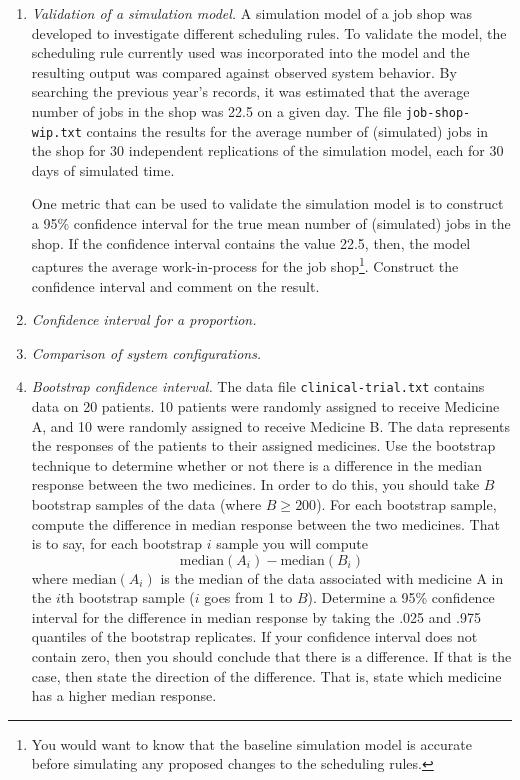 \begin{enumerate}
\item \emph{Validation of a simulation model.} A simulation model of a
  job shop was developed to investigate different scheduling rules. To
  validate the model, the scheduling rule currently used was
  incorporated into the model and the resulting output was compared
  against observed system behavior. By searching the previous year’s
  records, it was estimated that the average number of jobs in the
  shop was 22.5 on a given day. The file \texttt{job-shop-wip.txt} contains the 
  results for the average number of (simulated) jobs in the shop for 30 independent 
  replications of the simulation model, each for 30 days of simulated time.

  One metric that can be used to validate the simulation model is to
  construct a 95\% confidence interval for the true mean number of
  (simulated) jobs in the shop. If the confidence interval
  contains the value 22.5, then, the model captures the average
  work-in-process for the job shop\footnote{You would want to know that the
  baseline simulation model is accurate before simulating any proposed
  changes to the scheduling rules.}. Construct the confidence interval
  and comment on the result.

\item \emph{Confidence interval for a proportion.} 

\item \emph{Comparison of system configurations.}


\item \emph{Bootstrap confidence interval.} The data file
  \texttt{clinical-trial.txt} contains data on 20 patients. 10
  patients were randomly assigned to receive Medicine A, and 10 were
  randomly assigned to receive Medicine B. The data represents the
  responses of the patients to their assigned medicines. Use the
  bootstrap technique to determine whether or not there is a
  difference in the median response between the two medicines.  In
  order to do this, you should take $B$ bootstrap samples of the data
  (where $B \geq 200$). For each bootstrap sample, compute the
  difference in median response between the two medicines. That is to
  say, for each bootstrap $i$ sample you will compute
  \[
  \text{median}(A_i) - \text{median}(B_i)
  \]
  where $\text{median}(A_i)$ is the median of the data associated with
  medicine A in the $i$th bootstrap sample ($i$ goes from 1 to
  $B$). Determine a 95\% confidence interval for the difference in
  median response by taking the .025 and .975 quantiles of the
  bootstrap replicates. If your confidence interval does not contain
  zero, then you should conclude that there is a difference. If that
  is the case, then state the direction of the difference. That is,
  state which medicine has a higher median response. \label{ex:boot}



\end{enumerate}
